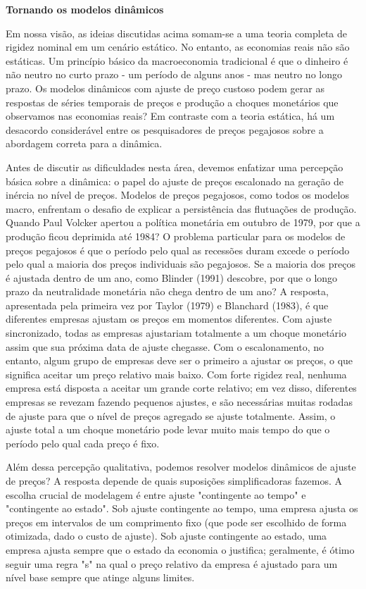 \documentclass[12pt]{article}
\begin{document}
\textbf{Tornando os modelos dinâmicos}

Em nossa visão, as ideias discutidas acima somam-se a uma teoria completa de rigidez nominal em um cenário estático. No entanto, as economias reais não são estáticas. Um princípio básico da macroeconomia tradicional é que o dinheiro é não neutro no curto prazo - um período de alguns anos - mas neutro no longo prazo. Os modelos dinâmicos com ajuste de preço custoso podem gerar as respostas de séries temporais de preços e produção a choques monetários que observamos nas economias reais? Em contraste com a teoria estática, há um desacordo considerável entre os pesquisadores de preços pegajosos sobre a abordagem correta para a dinâmica.

Antes de discutir as dificuldades nesta área, devemos enfatizar uma percepção básica sobre a dinâmica: o papel do ajuste de preços escalonado na geração de inércia no nível de preços. Modelos de preços pegajosos, como todos os modelos macro, enfrentam o desafio de explicar a persistência das flutuações de produção. Quando Paul Volcker apertou a política monetária em outubro de 1979, por que a produção ficou deprimida até 1984? O problema particular para os modelos de preços pegajosos é que o período pelo qual as recessões duram excede o período pelo qual a maioria dos preços individuais são pegajosos. Se a maioria dos preços é ajustada dentro de um ano, como Blinder (1991) descobre, por que o longo prazo da neutralidade monetária não chega dentro de um ano? A resposta, apresentada pela primeira vez por Taylor (1979) e Blanchard (1983), é que diferentes empresas ajustam os preços em momentos diferentes. Com ajuste sincronizado, todas as empresas ajustariam totalmente a um choque monetário assim que sua próxima data de ajuste chegasse. Com o escalonamento, no entanto, algum grupo de empresas deve ser o primeiro a ajustar os preços, o que significa aceitar um preço relativo mais baixo. Com forte rigidez real, nenhuma empresa está disposta a aceitar um grande corte relativo; em vez disso, diferentes empresas se revezam fazendo pequenos ajustes, e são necessárias muitas rodadas de ajuste para que o nível de preços agregado se ajuste totalmente. Assim, o ajuste total a um choque monetário pode levar muito mais tempo do que o período pelo qual cada preço é fixo.

Além dessa percepção qualitativa, podemos resolver modelos dinâmicos de ajuste de preços? A resposta depende de quais suposições simplificadoras fazemos. A escolha crucial de modelagem é entre ajuste "contingente ao tempo" e "contingente ao estado". Sob ajuste contingente ao tempo, uma empresa ajusta os preços em intervalos de um comprimento fixo (que pode ser escolhido de forma otimizada, dado o custo de ajuste). Sob ajuste contingente ao estado, uma empresa ajusta sempre que o estado da economia o justifica; geralmente, é ótimo seguir uma regra "s" na qual o preço relativo da empresa é ajustado para um nível base sempre que atinge alguns limites.
\end{document}
